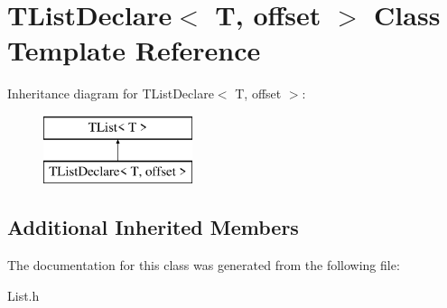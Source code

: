 \hypertarget{class_t_list_declare}{\section{T\-List\-Declare$<$ T, offset $>$ Class Template Reference}
\label{class_t_list_declare}
}
Inheritance diagram for T\-List\-Declare$<$ T, offset $>$\-:\begin{figure}[H]
\begin{center}
\leavevmode
\includegraphics[height=2.000000cm]{class_t_list_declare}
\end{center}
\end{figure}
\subsection*{Additional Inherited Members}


The documentation for this class was generated from the following file\-:\begin{DoxyCompactItemize}
\item 
List.\-h\end{DoxyCompactItemize}
